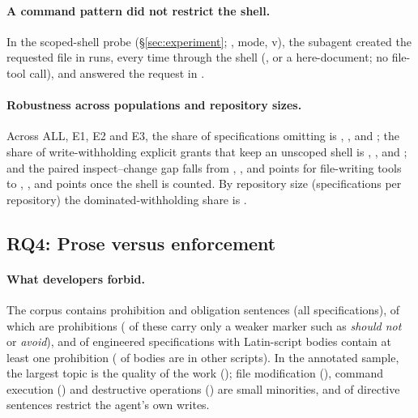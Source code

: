 \paragraph{A command pattern did not restrict the shell.}
In the scoped-shell probe (\S\ref{sec:experiment}; ,  mode,
v\ScopedBuild{}), the subagent created the requested file in \ScopedCreated{} runs, every time through the shell
(,  or a here-document; no file-tool call), and answered the  request in
\ScopedControls{}.

\paragraph{Robustness across populations and repository sizes.}
Across ALL, E1, E2 and E3, the share of specifications omitting  is \PopAllImplicit{}, \PopEoneImplicit{},
\PopEtwoImplicit{} and \PopEthreeImplicit{}; the share of write-withholding explicit grants that keep an unscoped shell
is \PopAllIncoherent{}, \PopEoneIncoherent{}, \PopEtwoIncoherent{} and \PopEthreeIncoherent{}; and the paired
inspect--change gap falls from \PopAllGapWrite{}, \PopEoneGapWrite{}, \PopEtwoGapWrite{} and \PopEthreeGapWrite{}
points for file-writing tools to \PopAllGapAuthority{}, \PopEoneGapAuthority{}, \PopEtwoGapAuthority{} and
\PopEthreeGapAuthority{} points once the shell is counted. By repository size (specifications per repository) the
dominated-withholding share is \RQthreeIncoherentBySize{}.

\subsection{RQ4: Prose versus enforcement}
\label{sec:res-rq4}

\paragraph{What developers forbid.}
The corpus contains \nDirectiveSentences{} prohibition and obligation sentences (all specifications), of which
\pctProhibitionSentences{} are prohibitions (\pctProhibitionWeakOnly{} of these carry only a weaker marker such as
\emph{should not} or \emph{avoid}), and \RQfourAnyProhibition{} of engineered specifications with Latin-script bodies
contain at least one prohibition (\pctNonLatin{} of bodies are in other scripts). In the annotated sample, the largest
topic is the quality of the work (\CatQuality{}); file modification (\CatFsModify{}), command execution (\CatExec{}) and
destructive operations (\CatDestructive{}) are small minorities, and \CatRestrictsWrites{} of directive sentences
restrict the agent's own writes.

